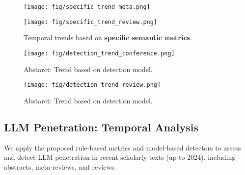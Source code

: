 \begin{figure}[t]
    \centering
    \begin{minipage}{0.49\linewidth}
        \centering
        \texttt{[image: fig/specific\_trend\_meta.png]}
        \captionsetup{font=footnotesize}
    \end{minipage}
    \hfill
    \begin{minipage}{0.49\linewidth}
        \centering
        \texttt{[image: fig/specific\_trend\_review.png]}
        \captionsetup{font=footnotesize}
    \end{minipage}
    \hfill
    \caption{Temporal trends based on \textbf{specific semantic metrics}.}
    \label{fig:trend_specific}
\end{figure}

\begin{figure}[t]
    \centering
    \texttt{[image: fig/detection\_trend\_conference.png]}
    \caption{Abstarct: Trend based on detection model.}
    \label{fig:trend_detect_abs}
\end{figure}

\begin{figure}[t]
    \centering
    \texttt{[image: fig/detection\_trend\_review.png]}
    \caption{Abstarct: Trend based on detection model.}
    \label{fig:trend_detect_review}
\end{figure}


\subsection{LLM Penetration: Temporal Analysis}
\label{sec:Temporal Analysis}
We apply the proposed rule-based metrics and model-based detectors to assess and detect LLM penetration in recent scholarly texts (up to 2024), including abstracts, meta-reviews, and reviews. 


